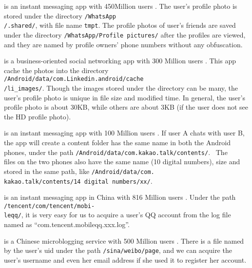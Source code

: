 \documentclass{sig-alternate}
\begin{document}
\vspace{2pt} is an instant messaging app with 450Million users \cite{10MessagingApps}. The user's profile photo is stored under the directory \texttt{/WhatsApp\\/.shared/}, with file name \texttt{tmpt}. The profile photos of user's friends are saved under the directory \texttt{/WhatsApp/Profile pictures/} after the profiles are viewed, and they are named by profile owners' phone numbers without any obfuscation.



\vspace{2pt} is a business-oriented social networking app with 300 Million users \cite{Linkedinuser}.  This app cache the photos into the directory \texttt{/Android/data/com.Linkedin.android/cache\\/li\_images/}.  Though the images stored under the directory can be many, the user's profile photo is unique in file size and modified time. In general, the user's profile photo is about 30KB, while others are about 3KB (if the user does not see the HD profile photo).


\vspace{2pt} is an instant messaging app with 100 Million users \cite{10MessagingApps}.  If user A chats with user B, the app will create a content folder has the same name in both the Android phones, under the path \texttt{/Android/data/com.kakao.talk/contents/}. ~The\\ files on the two phones also have the same name (10 digital numbers), size and stored in the same path, like \texttt{/Android/data/com.\\kakao.talk/contents/14 digital numbers/xx/}.



\vspace{2pt} is an instant messaging app in China with 816 Million users \cite{allusers}.  Under the path \texttt{/tencent/com/tencent/mobi-\\leqq/}, it is very easy for us to acquire a user's  QQ account from the log file named as ``com.tencent.mobileqq.xxx.log''.


\vspace{2pt} is a Chinese microblogging service with 500 Million users \cite{Weibouser}. There is a file named by the user's uid under the path \texttt{/sina/weibo/page}, and we can acquire the user's username and even her email address if she used it to register her account.
\end{document}
